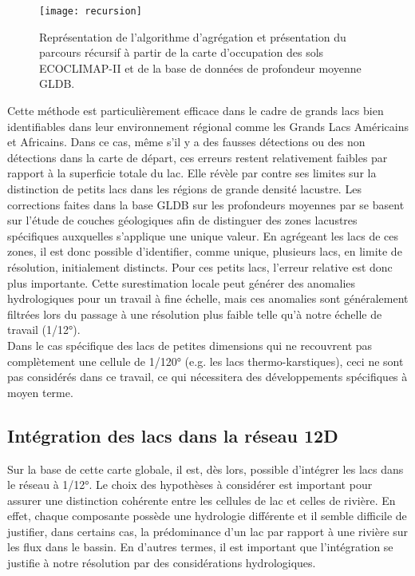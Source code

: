\begin{figure}[h!]
\centering
\texttt{[image: recursion]}
\caption{Représentation de l'algorithme d'agrégation et présentation du parcours récursif à partir de la carte d'occupation des sols ECOCLIMAP-II et de la base de données de profondeur moyenne GLDB.}
\label{recursion}
\end{figure}
\clearpage

Cette méthode est particulièrement efficace dans le cadre de grands lacs bien identifiables dans leur environnement régional comme les Grands Lacs Américains et Africains. Dans ce cas, même s'il y a des fausses détections ou des non détections dans la carte de départ, ces erreurs restent relativement faibles par rapport à la superficie totale du lac. Elle révèle par contre ses limites sur la distinction de petits lacs dans les régions de grande densité lacustre. Les corrections faites dans la base GLDB sur les profondeurs moyennes par \citet{choulga2014} se basent sur l'étude de couches géologiques afin de distinguer des zones lacustres spécifiques auxquelles s'applique une unique valeur. En agrégeant les lacs de ces zones, il est donc possible d'identifier, comme unique, plusieurs lacs, en limite de résolution, initialement distincts. Pour ces petits lacs, l'erreur relative est donc plus importante. Cette surestimation locale peut générer des anomalies hydrologiques pour un travail à fine échelle, mais ces anomalies sont généralement filtrées lors du passage à une résolution plus faible telle qu'à notre échelle de travail (1/12°).\\
Dans le cas spécifique des lacs de petites dimensions qui ne recouvrent pas complètement une cellule de 1/120° (e.g. les lacs thermo-karstiques), ceci ne sont pas considérés dans ce travail, ce qui nécessitera des développements spécifiques à moyen terme.


\subsection{{\selectfont Intégration des lacs dans la réseau 12D}}
\label{sec:intégration}

Sur la base de cette carte globale, il est, dès lors, possible d'intégrer les lacs dans le réseau à 1/12°. Le choix des hypothèses à considérer est important pour assurer une distinction cohérente entre les cellules de lac et celles de rivière. En effet, chaque composante possède une hydrologie différente et il semble difficile de justifier, dans certains cas, la prédominance d'un lac par rapport à une rivière sur les flux dans le bassin. En d'autres termes, il est important que l'intégration se justifie à notre résolution par des considérations hydrologiques.\\

